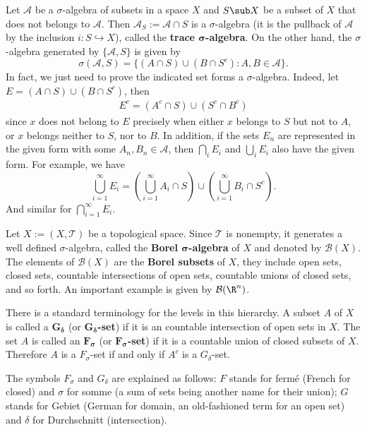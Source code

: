 \begin{example}\label{sigma alg int union eg}
Let $\mathcal{A}$ be a $\sigma$-algebra of subsets in a space $X$ and $S\sub X$ be a subset of $X$ that does not belongs to $\mathcal{A}$. Then $\mathcal{A}_S:=\mathcal{A}\cap S$ is a $\sigma$-algebra (it is the pullback of $\mathcal{A}$ by the inclusion $i:S\hookrightarrow X$), called the \textbf{trace $\bm{\sigma}$-algebra}. On the other hand, the $\sigma$-algebra generated by $\{\mathcal{A},S\}$ is given by
\[\sigma(\mathcal{A},S)=\{(A\cap S)\cup(B\cap S^c):A,B\in\mathcal{A}\}.\]
In fact, we just need to prove the indicated set forms a $\sigma$-algebra. Indeed, let $E=(A\cap S)\cup(B\cap S^c)$, then
\begin{align*}
E^c=(A^c\cap S)\cup(S^c\cap B^c)
\end{align*}
since $x$ does not belong to $E$ precisely when either $x$ belongs to $S$ but not to $A$, or $x$ belongs neither to $S$, nor to $B$. In addition, if the sets $E_n$ are represented in the given form with some $A_n,B_n\in\mathcal{A}$, then $\bigcap_{i}E_i$ and $\bigcup_iE_i$ also have the given form. For example, we have
\[\bigcup_{i=1}^{\infty}E_i=(\bigcup_{i=1}^{\infty}A_i\cap S)\cup(\bigcup_{i=1}^{\infty}B_i\cap S^c).\]
And similar for $\bigcap_{i=1}^{\infty}E_i$.
\end{example}
Let $X:=(X,\mathcal{T})$ be a topological space. Since $\mathcal{T}$ is nonempty, it generates a well defined $\sigma$-algebra, called the \textbf{Borel $\bm{\sigma}$-algebra} of $X$ and denoted by $\mathcal{B}(X)$. The elements of $\mathcal{B}(X)$ are the \textbf{Borel subsets} of $X$, they include open sets, closed sets, countable intersections of open sets, countable unions of closed sets, and so forth. An important example is given by $\mathcal{B}(\R^n)$.\par
There is a standard terminology for the levels in this hierarchy. A subset $A$ of $X$ is called a $\bm{G_{\delta}}$ (or \textbf{$\bm{G_{\delta}}$-set}) if it is an countable intersection of open sets in $X$. The set $A$ is called an $\bm{F_{\sigma}}$ (or \textbf{$\bm{F_{\sigma}}$-set}) if it is a countable union of closed subsets of $X$. Therefore $A$ is a $F_{\sigma}$-set if and only if $A^c$ is a $G_{\delta}$-set.\par
The symbols $F_{\sigma}$ and $G_{\delta}$ are explained as follows: $F$ stands for ferm\'e (French for closed) and $\sigma$ for somme (a sum of sets being another name for their union); $G$ stands for Gebiet (German for domain, an old-fashioned term for an open set) and $\delta$ for Durchschnitt (intersection).\par

